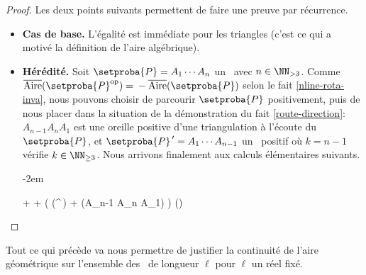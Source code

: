 \begin{proof}
    Les deux points suivants permettent de faire une preuve par récurrence.

    \begin{itemize}
		\item \textbf{Cas de base.}
		L'égalité est immédiate pour les triangles (c'est ce qui a motivé la définition de l'aire algébrique).


		\item \textbf{Hérédité.}
		Soit $\setproba{P} = A_1 \cdots A_n$ un \ngone\ avec $n \in \NN_{>3}$.
		Comme $\sarea{\setproba{P}^{\mathrm{op}}} = {} - \sarea{\setproba{P}}$ selon le fait \ref{nline-rota-inva}, nous pouvons choisir de parcourir $\setproba{P}$ positivement, puis de nous placer dans la situation de la démonstration du fait \ref{route-direction}:
		$A_{n-1} A_n A_1$ est une oreille positive d'une triangulation à l'écoute du \ngone\ $\setproba{P}$, et $\setproba{P}^{\,\prime} = A_1 \cdots A_{n-1}$ un \kgone\ positif où $k = n-1$ vérifie $k \in \NN_{\geq3}$.
		Nous arrivons finalement aux calculs élémentaires suivants.
		
		\leavevmode\kern-2em%
		\begin{stepcalc}[style=ar*]
		          {}
		     + 
		          {}
		      +  
		          {}
		     \big( \mu(^{\,\prime}) + \mu(A_{n-1} A_n A_1) \big)
		          {}
		     \mu()
		          {}
		     
		\explnext{}
		\end{stepcalc}
    \end{itemize}
    
    \null\vspace{-3.5ex}
\end{proof}




Tout ce qui précède va nous permettre de justifier la continuité de l'aire géométrique sur l'ensemble des \ncycles\ de longueur $\ell$ pour $\ell$ un réel fixé.



